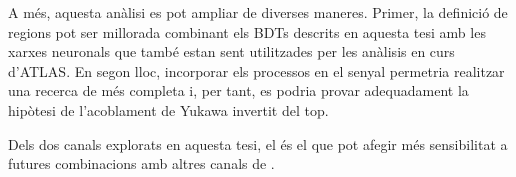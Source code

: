 A més, aquesta anàlisi es pot ampliar de diverses maneres. Primer, la definició de regions pot ser millorada combinant els BDTs descrits en aquesta tesi amb les xarxes neuronals que també estan sent utilitzades per les anàlisis en curs d'ATLAS. En segon lloc, incorporar els processos \tWH en el senyal permetria realitzar una recerca de \tH més completa i, per tant, es podria provar adequadament la hipòtesi de l'acoblament de Yukawa invertit del top.

Dels dos canals explorats en aquesta tesi, el \dilepSStau és el que pot afegir més sensibilitat a futures combinacions amb altres canals de \tHq.





